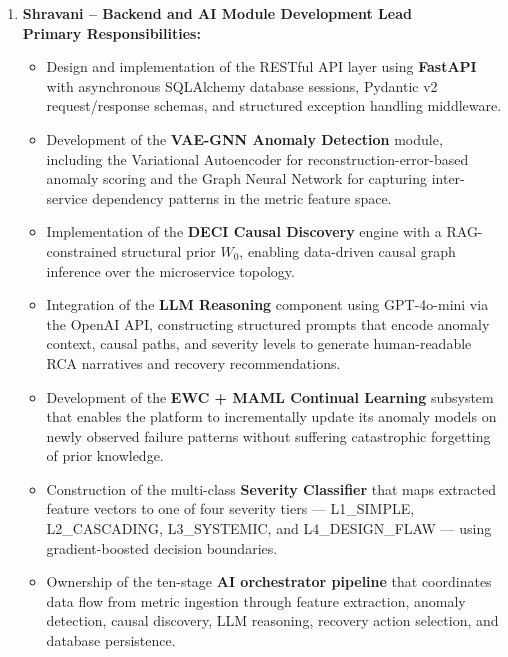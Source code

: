 \begin{enumerate}

    \item \textbf{Shravani -- Backend and AI Module Development Lead}\\
    \textbf{Primary Responsibilities:}
    \begin{itemize}
        \item Design and implementation of the RESTful API layer using \textbf{FastAPI} with asynchronous SQLAlchemy database sessions, Pydantic v2 request/response schemas, and structured exception handling middleware.
        \item Development of the \textbf{VAE-GNN Anomaly Detection} module, including the Variational Autoencoder for reconstruction-error-based anomaly scoring and the Graph Neural Network for capturing inter-service dependency patterns in the metric feature space.
        \item Implementation of the \textbf{DECI Causal Discovery} engine with a RAG-constrained structural prior $W_0$, enabling data-driven causal graph inference over the microservice topology.
        \item Integration of the \textbf{LLM Reasoning} component using GPT-4o-mini via the OpenAI API, constructing structured prompts that encode anomaly context, causal paths, and severity levels to generate human-readable RCA narratives and recovery recommendations.
        \item Development of the \textbf{EWC + MAML Continual Learning} subsystem that enables the platform to incrementally update its anomaly models on newly observed failure patterns without suffering catastrophic forgetting of prior knowledge.
        \item Construction of the multi-class \textbf{Severity Classifier} that maps extracted feature vectors to one of four severity tiers — L1\_SIMPLE, L2\_CASCADING, L3\_SYSTEMIC, and L4\_DESIGN\_FLAW — using gradient-boosted decision boundaries.
        \item Ownership of the ten-stage \textbf{AI orchestrator pipeline} that coordinates data flow from metric ingestion through feature extraction, anomaly detection, causal discovery, LLM reasoning, recovery action selection, and database persistence.
    \end{itemize}


\end{enumerate}
